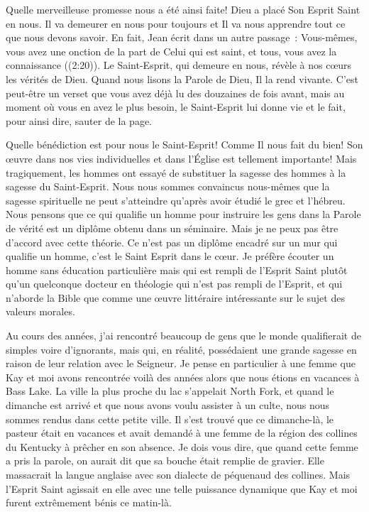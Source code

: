 Quelle merveilleuse promesse nous a été ainsi faite! Dieu a placé Son Esprit
 Saint en nous. Il va demeurer en nous pour toujours \ocadr et Il va nous
 apprendre tout ce que nous devons savoir. En fait, Jean écrit dans un autre
 passage~:
 \og Vous-mêmes, vous avez une onction de la part de Celui qui est saint,
 et tous, vous avez la connaissance \fg{} ((2:20)).
 Le Saint-Esprit, qui demeure en nous, révèle à nos c\oe{}urs les vérités de Dieu.
 Quand nous lisons la Parole de Dieu, Il la rend vivante.
 C'est peut-être un verset que vous avez déjà lu des douzaines de fois avant,
 mais au moment où vous en avez le plus besoin, le Saint-Esprit lui donne vie
 et le fait, pour ainsi dire, sauter de la page.
 
Quelle bénédiction est pour nous le Saint-Esprit!
 Comme Il nous fait du bien! Son \oe{}uvre dans nos vies individuelles et dans
 l'Église est tellement importante! Mais tragiquement, les hommes ont essayé de
 substituer la sagesse des hommes à la sagesse du Saint-Esprit.
 Nous nous sommes convaincus nous-mêmes que la sagesse spirituelle ne peut
 s'atteindre qu'après avoir étudié le grec et l'hébreu. Nous pensons que ce qui
 qualifie un homme pour instruire les gens dans la Parole de vérité est
 un diplôme obtenu dans un séminaire.
 Mais je ne peux pas être d'accord avec cette théorie.
 Ce n'est pas un diplôme encadré sur un mur qui qualifie un homme,
 c'est le Saint Esprit dans le c\oe{}ur.
 Je préfère écouter un homme sans éducation particulière mais
 qui est rempli de l'Esprit Saint plutôt qu'un quelconque docteur
 en théologie qui n'est pas rempli de l'Esprit,
 et qui n'aborde la Bible que comme une \oe{}uvre littéraire intéressante
 sur le sujet des valeurs morales. 

Au cours des années, j'ai rencontré beaucoup de gens que le monde
 qualifierait de simples voire d'ignorants, mais qui, en réalité,
 possédaient une grande sagesse en raison de leur relation avec le Seigneur.
 Je pense en particulier à une femme que Kay et moi avons rencontrée
 voilà des années alors que nous étions en vacances à Bass Lake.
 La ville la plus proche du lac s'appelait North Fork, et quand le dimanche
 est arrivé et que nous avons voulu assister à un culte,
 nous nous sommes rendus dans cette petite ville. Il s'est trouvé que ce
 dimanche-là, le pasteur était en vacances et avait demandé
 à une femme de la région des collines du Kentucky à 
 prêcher en son absence.
 Je dois vous dire, que quand cette femme a pris la parole, on aurait dit
 que sa bouche était remplie de gravier. Elle massacrait la langue anglaise
 avec son dialecte de péquenaud des collines.
 Mais l'Esprit Saint agissait en elle avec une telle puissance dynamique
 que Kay et moi furent extrêmement bénis ce matin-là.

